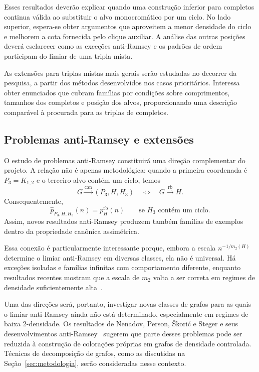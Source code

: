 \documentclass[11pt,a4paper]{article}
\newcommand{\can}{\stackrel{\mathrm{can}}{\longrightarrow}}
\newcommand{\rb}{\stackrel{\mathrm{rb}}{\longrightarrow}}
\theoremstyle{plain}
\theoremstyle{definition}
\begin{document}
Esses resultados deverão explicar quando uma construção inferior
para completos continua válida ao substituir o alvo monocromático
por um ciclo. No lado superior, espera-se obter argumentos que
aproveitem a menor densidade do ciclo e melhorem a cota fornecida
pelo clique auxiliar. A análise das outras posições deverá
esclarecer como as exceções anti-Ramsey e os padrões de ordem
participam do limiar de uma tripla mista.

As extensões para triplas mistas mais gerais serão estudadas no
decorrer da pesquisa, a partir dos métodos desenvolvidos nos
casos prioritários. Interessa obter enunciados que cubram
famílias por condições sobre comprimentos, tamanhos dos
completos e posição dos alvos, proporcionando uma descrição
comparável à procurada para as triplas de completos.


\subsection{Problemas anti-Ramsey e extensões}
\label{sec:anti-problemas}
\label{sec:classes}


O estudo de problemas anti-Ramsey constituirá uma direção complementar
do projeto. A relação não é apenas metodológica: quando a primeira
coordenada é $P_3=K_{1,2}$ e o terceiro alvo contém um ciclo, temos
\[
  G\can(P_3,H,H_3)
  \quad\Longleftrightarrow\quad
  G\rb H.
\]
Consequentemente,
\[
  \widehat p_{P_3,H,H_3}(n)
  =
  p_H^{\mathrm{rb}}(n)
  \qquad\text{se $H_3$ contém um ciclo}.
\]
Assim, novos resultados anti-Ramsey produzem também famílias de
exemplos dentro da propriedade canônica assimétrica.

Essa conexão é particularmente interessante porque, embora a escala
$n^{-1/m_2(H)}$ determine o limiar anti-Ramsey em diversas classes,
ela não é universal. Há exceções isoladas e famílias infinitas com
comportamento diferente, enquanto resultados recentes mostram que
a escala de $m_2$ volta a ser correta em regimes de densidade
suficientemente alta~\cite{KKM,BCMP,KMPS,KKM2,AMMMM,Kup}.

Uma das direções será, portanto, investigar novas classes de grafos
para as quais o limiar anti-Ramsey ainda não está determinado,
especialmente em regimes de baixa $2$-densidade. Os resultados de
Nenadov, Person, Škorić e Steger e seus desenvolvimentos
anti-Ramsey~\cite{NPSS,BHHLM} sugerem que parte desses problemas pode
ser reduzida à construção de colorações próprias em grafos de densidade
controlada. Técnicas de decomposição de grafos, como as discutidas na
Seção~\ref{sec:metodologia}, serão consideradas nesse contexto.
\end{document}
